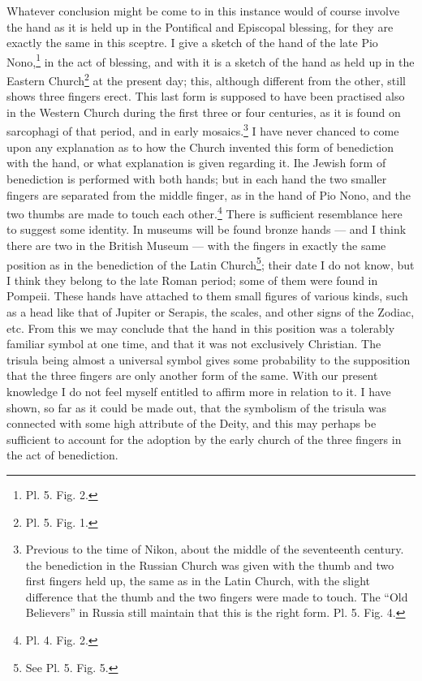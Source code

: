 \documentclass[a4paper, 11pt, oneside, english, landscape, twocolumn]{article}
\begin{document}
Whatever conclusion might be come to in this instance would of course involve the hand as it is held up in the Pontifical and Episcopal blessing, for they are exactly the same in this sceptre. I give a sketch of the hand of the late Pio Nono,\footnote{Pl. 5. Fig. 2.} in the act of blessing, and with it is a sketch of the hand as held up in the Eastern Church\footnote{Pl. 5. Fig. 1.} at the present day; this, although different from the other, still shows three fingers erect. This last form is supposed to have been practised also in the Western Church during the first three or four centuries, as it is found on sarcophagi of that period, and in early mosaics.\footnote{Previous to the time of Nikon, about the middle of the seventeenth century. the benediction in the Russian Church was given with the thumb and two first fingers held up, the same as in the Latin Church, with the slight difference that the thumb and the two fingers were made to touch. The ``Old Believers'' in Russia still maintain that this is the right form. Pl. 5. Fig. 4.} I have never chanced to come upon any explanation as to how the Church invented this form of benediction with the hand, or what explanation is given regarding it. Ihe Jewish form of benediction is performed with both hands; but in each hand the two smaller fingers are separated from the middle finger, as in the hand of Pio Nono, and the two thumbs are made to touch each other.\footnote{Pl. 4. Fig. 2.} There is sufficient resemblance here to suggest some identity. In museums will be found bronze hands --- and I think there are two in the British Museum --- with the fingers in exactly the same position as in the benediction of the Latin Church\footnote{See Pl. 5. Fig. 5.}; their date I do not know, but I think they belong to the late Roman period; some of them were found in Pompeii. These hands have attached to them small figures of various kinds, such as a head like that of Jupiter or Serapis, the scales, and other signs of the Zodiac, etc. From this we may conclude that the hand in this position was a tolerably familiar symbol at one time, and that it was not exclusively Christian. The trisula being almost a universal symbol gives some probability to the supposition that the three fingers are only another form of the same. With our present knowledge I do not feel myself entitled to affirm more in relation to it. I have shown, so far as it could be made out, that the symbolism of the trisula was connected with some high attribute of the Deity, and this may perhaps be sufficient to account for the adoption by the early church of the three fingers in the act of benediction.
\end{document}
